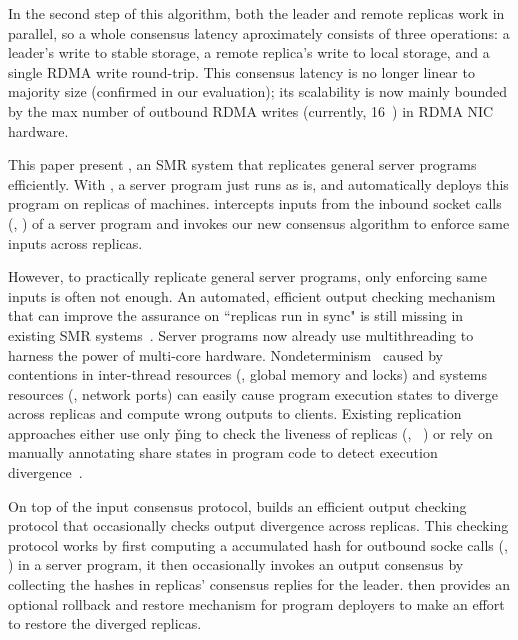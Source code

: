 In the second step of this algorithm, both the leader and remote replicas work 
in parallel, so a whole consensus latency aproximately consists of 
three operations: a leader's write to stable storage, a remote replica's write 
to local storage, and a single RDMA write round-trip. This consensus latency is 
no longer linear to majority size (confirmed in our evaluation); its 
scalability is now mainly bounded by the max number of outbound RDMA 
writes (currently, 16~\cite{herd:sigcomm}) in RDMA NIC hardware.

This paper present \xxx, an SMR system that replicates general server programs 
efficiently. With \xxx, a server program just runs as is, and \xxx 
automatically deploys this program on replicas of machines. \xxx intercepts 
inputs from the inbound socket calls (\eg, \recv) of a server program and 
invokes our new consensus algorithm to enforce same inputs across replicas.


However, to practically replicate general server programs, only enforcing same 
inputs is often not enough. An automated, efficient output checking mechanism 
that can improve the assurance on ``replicas run in sync" is still missing in 
existing SMR 
systems~\cite{calvin:sigmod12,rex:eurosys14,crane:sosp15,dare:hpdc15}. Server 
programs now already use multithreading to harness the power of multi-core 
hardware. Nondeterminism~\cite{racepro:sosp11,dmp:asplos09,coredet:asplos10,
cui:tern:osdi10, kendo:asplos09,
dthreads:sosp11,peregrine:sosp11,parrot:sosp13,determinator:osdi10} caused by 
contentions in inter-thread resources (\eg, global memory and locks) and systems 
resources (\eg, network ports) can easily cause program execution states to 
diverge across replicas and compute wrong outputs to clients. Existing 
replication approaches either use only \v{ping} to check the liveness of 
replicas (\eg, \redis~\cite{redis}) or rely on manually annotating share states 
in program code to detect execution divergence~\cite{eve:osdi12}.

On top of the input consensus protocol, \xxx builds an efficient output 
checking protocol that occasionally checks output divergence across replicas. 
This checking protocol works by first computing a accumulated hash for outbound 
socke calls (\eg, \send) in a server program, it then occasionally invokes an 
output consensus by collecting the hashes in replicas' consensus replies for 
the leader. \xxx then provides an optional rollback and restore mechanism for 
program deployers to make an effort to restore the diverged replicas.

